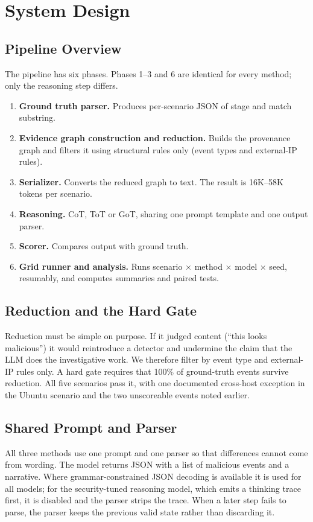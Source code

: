 \documentclass[a4paper, 12pt]{report}
\theoremstyle{definition}
\begin{document}
\chapter{System Design}
\label{chap.4}
\section{Pipeline Overview}
The pipeline has six phases. Phases 1--3 and 6 are identical for every method; only the reasoning step differs.
\begin{enumerate}
	\item \textbf{Ground truth parser.} Produces per-scenario JSON of stage and match substring.
	\item \textbf{Evidence graph construction and reduction.} Builds the provenance graph and filters it using structural rules only (event types and external-IP rules).
	\item \textbf{Serializer.} Converts the reduced graph to text. The result is 16K--58K tokens per scenario.
	\item \textbf{Reasoning.} CoT, ToT or GoT, sharing one prompt template and one output parser.
	\item \textbf{Scorer.} Compares output with ground truth.
	\item \textbf{Grid runner and analysis.} Runs scenario $\times$ method $\times$ model $\times$ seed, resumably, and computes summaries and paired tests.
\end{enumerate}

\section{Reduction and the Hard Gate}
Reduction must be simple on purpose. If it judged content (``this looks malicious'') it would reintroduce a detector and undermine the claim that the LLM does the investigative work. We therefore filter by event type and external-IP rules only. A hard gate requires that 100\% of ground-truth events survive reduction. All five scenarios pass it, with one documented cross-host exception in the Ubuntu scenario and the two unscoreable events noted earlier.

\section{Shared Prompt and Parser}
All three methods use one prompt and one parser so that differences cannot come from wording. The model returns JSON with a list of malicious events and a narrative. Where grammar-constrained JSON decoding is available it is used for all models; for the security-tuned reasoning model, which emits a thinking trace first, it is disabled and the parser strips the trace. When a later step fails to parse, the parser keeps the previous valid state rather than discarding it.
\end{document}
